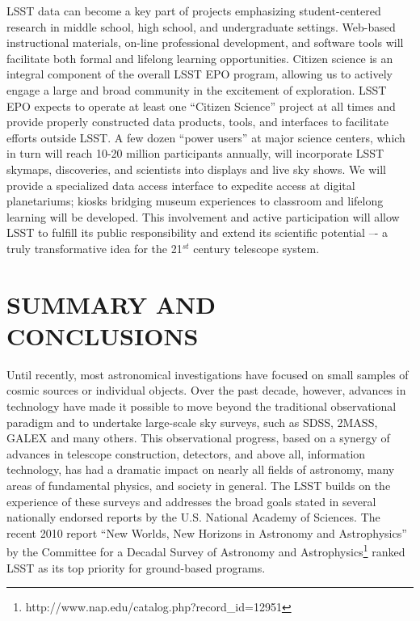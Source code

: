 \documentclass{emulateapj}
\begin{document}
{LSST data can become a key part of projects emphasizing student-centered research in middle school, high 
school, and undergraduate settings. Web-based instructional materials, on-line professional development, and 
software tools will facilitate both formal and lifelong learning opportunities.  Citizen science is an integral 
component of the overall LSST EPO program, allowing us to actively engage a large and broad community in 
the excitement of exploration.  LSST EPO expects to operate at least one ``Citizen Science'' project at all times and provide 
properly constructed data products, tools, and interfaces to facilitate efforts outside LSST.   A few dozen 
``power users'' at major science centers, which in turn will reach 10-20 million participants annually, will incorporate 
LSST skymaps, discoveries,  and scientists into displays and live sky shows.  We will provide a specialized data 
access interface to expedite access at digital planetariums; kiosks bridging museum experiences to classroom 
and lifelong learning will be developed. This 
involvement and active participation will allow LSST to fulfill its public responsibility and extend its scientific 
potential –- a truly transformative idea for the 21$^{st}$ century telescope system.
}



\section{SUMMARY AND CONCLUSIONS} 
\label{Sec:conclusions}

Until recently, most astronomical investigations have focused on small 
samples of cosmic sources or individual objects. Over the past decade, 
however, advances in technology have made it possible to move beyond the 
traditional observational paradigm and to undertake large-scale sky 
surveys, such as SDSS, 2MASS, GALEX and many others. This observational 
progress, based on a synergy of advances in telescope construction, detectors, 
and above all, information technology, has had a dramatic impact on nearly all 
fields of astronomy, many areas of fundamental physics, and society in 
general. The LSST builds on the experience of these surveys and addresses
the broad goals stated in several nationally endorsed reports by the U.S. 
National Academy of Sciences. The recent 2010 report ``New Worlds, New Horizons 
in Astronomy and Astrophysics'' by the Committee for a Decadal Survey of Astronomy and 
Astrophysics\footnote{http://www.nap.edu/catalog.php?record\_id=12951}
ranked LSST as its top priority for ground-based programs.
\end{document}
